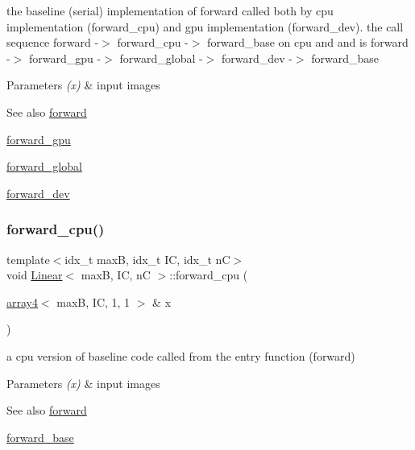 the baseline (serial) implementation of forward called both by cpu implementation (forward\+\_\+cpu) and gpu implementation (forward\+\_\+dev). the call sequence forward -\/$>$ forward\+\_\+cpu -\/$>$ forward\+\_\+base on cpu and and is forward -\/$>$ forward\+\_\+gpu -\/$>$ forward\+\_\+global -\/$>$ forward\+\_\+dev -\/$>$ forward\+\_\+base 


\begin{DoxyParams}{Parameters}
{\em (x)} & input images \\
\hline
\end{DoxyParams}
\begin{DoxySeeAlso}{See also}
\hyperlink{structLinear_aed0294f2d1c2013f66d89a52474352e5}{forward} 

\hyperlink{structLinear_a1d794073640bad48f9722f5d40b98902}{forward\+\_\+gpu} 

\hyperlink{softmaxcrossentropy_8h_a578aeeb166bd06e800d9b396eab48b35}{forward\+\_\+global} 

\hyperlink{structLinear_a2b86dba92137500810cbf3ed95ee1fcb}{forward\+\_\+dev} 
\end{DoxySeeAlso}
\mbox{\label{structLinear_a02f18ced52dc4bd6aa0ea45119c6a7e0}} 
\subsubsection{\texorpdfstring{forward\+\_\+cpu()}{forward\_cpu()}}
{\footnotesize\ttfamily template$<$idx\+\_\+t maxB, idx\+\_\+t IC, idx\+\_\+t nC$>$ \\
void \hyperlink{structLinear}{Linear}$<$ maxB, IC, nC $>$\+::forward\+\_\+cpu (\begin{DoxyParamCaption}\item[{\hyperlink{structarray4}{array4}$<$ maxB, IC, 1, 1 $>$ \&}]{x }\end{DoxyParamCaption})\hspace{0.3cm}{\ttfamily [inline]}}



a cpu version of baseline code called from the entry function (forward) 


\begin{DoxyParams}{Parameters}
{\em (x)} & input images \\
\hline
\end{DoxyParams}
\begin{DoxySeeAlso}{See also}
\hyperlink{structLinear_aed0294f2d1c2013f66d89a52474352e5}{forward} 

\hyperlink{structLinear_adb02d44e0558e4e26b9a550945cd3b7e}{forward\+\_\+base} 
\end{DoxySeeAlso}
\mbox{\label{structLinear_a2b86dba92137500810cbf3ed95ee1fcb}} 
